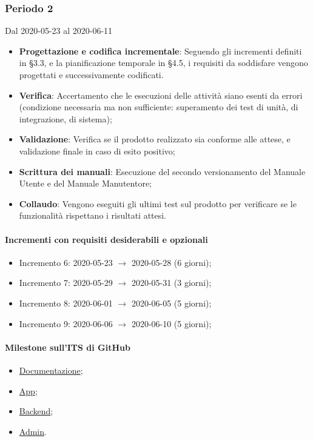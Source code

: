 \subsubsection{Periodo 2} 
Dal 2020-05-23 al 2020-06-11
\begin{itemize}
	\item \textbf{Progettazione e codifica incrementale}: Seguendo gli incrementi definiti in §3.3, e la pianificazione temporale in §4.5, i requisiti da soddisfare vengono progettati e successivamente codificati.
	\item \textbf{Verifica}: Accertamento che le esecuzioni delle attività siano esenti da errori (condizione necessaria ma non sufficiente: superamento dei test di unità, di integrazione, di sistema);
	\item \textbf{Validazione}: Verifica se il prodotto realizzato sia conforme alle attese, e validazione finale in caso di esito positivo;
	\item \textbf{Scrittura dei manuali}: Esecuzione del secondo versionamento del Manuale Utente e del Manuale Manutentore;
	\item \textbf{Collaudo}: Vengono eseguiti gli ultimi test sul prodotto per verificare se le funzionalità rispettano i risultati attesi.
\end{itemize}
\paragraph{Incrementi con requisiti desiderabili e opzionali}
\begin{itemize}
	\item Incremento 6: 2020-05-23 $\rightarrow$ 2020-05-28 (6 giorni);
	\item Incremento 7: 2020-05-29 $\rightarrow$ 2020-05-31 (3 giorni);
	\item Incremento 8: 2020-06-01 $\rightarrow$ 2020-06-05 (5 giorni);
	\item Incremento 9: 2020-06-06 $\rightarrow$ 2020-06-10 (5 giorni);
\end{itemize}
\paragraph{Milestone sull'ITS di GitHub}
\begin{itemize}
	\item \href{https://github.com/qb-team/Stalker-Documentazione/milestone/16}{Documentazione};
	\item \href{https://github.com/qb-team/Stalker-App/milestone/5}{App};
	\item \href{https://github.com/qb-team/Stalker-Backend/milestone/6}{Backend};
	\item \href{https://github.com/qb-team/Stalker-Admin/milestone/6}{Admin}.
\end{itemize}

